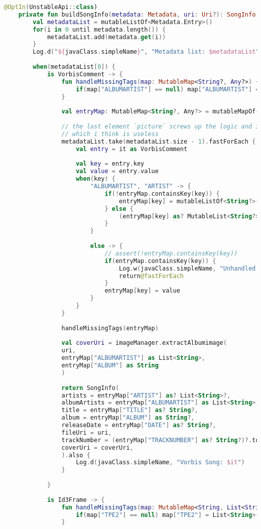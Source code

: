 \begin{lstlisting}[caption=Metoda \texttt{buildSongInfo()}, label={lst:Tag-buildsonginfo}, language=kotlin]
	@OptIn(UnstableApi::class)
	private fun buildSongInfo(metadata: Metadata, uri: Uri?): SongInfo {
		val metadataList = mutableListOf<Metadata.Entry>()
		for(i in 0 until metadata.length()) {
			metadataList.add(metadata.get(i))
		}
		Log.d("${javaClass.simpleName}", "Metadata list: $metadataList")
		
		when(metadataList[0]) {
			is VorbisComment -> {
				fun handleMissingTags(map: MutableMap<String?, Any?>) {
					if(map["ALBUMARTIST"] == null) map["ALBUMARTIST"] = List<String>(1,{"Unknown"} )
				}
				
				val entryMap: MutableMap<String?, Any?> = mutableMapOf()
				
				// the last element `picture` screws up the logic and it only has a mimetype value
				// which i think is useless
				metadataList.take(metadataList.size - 1).fastForEach {
					val entry = it as VorbisComment
					
					val key = entry.key
					val value = entry.value
					when(key) {
						"ALBUMARTIST", "ARTIST" -> {
							if(!entryMap.containsKey(key)) {
								entryMap[key] = mutableListOf<String?>(value)
							} else {
								(entryMap[key] as? MutableList<String?>)?.add(value)
							}
						}
						
						else -> {
							// assert(!entryMap.containsKey(key))
							if(entryMap.containsKey(key)) {
								Log.w(javaClass.simpleName, "Unhandled duplicate key: $key")
								return@fastForEach
							}
							entryMap[key] = value
						}
					}
				}
				
				handleMissingTags(entryMap)
				
				val coverUri = imageManager.extractAlbumimage(
				uri,
				entryMap["ALBUMARTIST"] as List<String>,
				entryMap["ALBUM"] as String
				)
				
				return SongInfo(
				artists = entryMap["ARTIST"] as? List<String>?,
				albumArtists = entryMap["ALBUMARTIST"] as List<String>,
				title = entryMap["TITLE"] as? String?,
				album = entryMap["ALBUM"] as String?,
				releaseDate = entryMap["DATE"] as? String?,
				fileUri = uri,
				trackNumber = (entryMap["TRACKNUMBER"] as? String?)?.toInt(),
				coverUri = coverUri,
				).also {
					Log.d(javaClass.simpleName, "Vorbis Song: $it")
				}
				
			}
			
			is Id3Frame -> {
				fun handleMissingTags(map: MutableMap<String, List<String>>) {
					if(map["TPE2"] == null) map["TPE2"] = List<String>(1,{"Unknown"} )
				}
				

\end{lstlisting}
